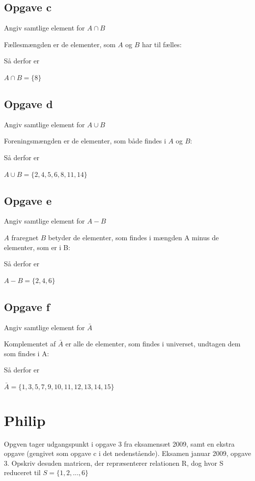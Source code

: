 \documentclass{article}
\begin{document}
\subsection*{Opgave c}
Angiv samtlige element for $A \cap B$

Fællesmængden er de elementer, som $A$ og $B$ har til fælles:

Så derfor er

\begin{center}
$A \cap B = \{ 8 \}$  
\end{center}

\subsection*{Opgave d}
Angiv samtlige element for $A \cup B$

Foreningsmængden er de elementer, som både findes i $A$ og $B$:

Så derfor er

\begin{center}
$A \cup B = \{ 2, 4, 5, 6, 8, 11, 14 \}$  
\end{center}

\subsection*{Opgave e}
Angiv samtlige element for $A - B$

$A$ fraregnet $B$ betyder de elementer, som findes i mængden A minus de elementer, som er i B:

Så derfor er

\begin{center}
$A - B = \{ 2, 4, 6 \}$  
\end{center}

\subsection*{Opgave f}
Angiv samtlige element for $\bar{A}$

Komplementet af $\bar{A}$ er alle de elementer, som findes i universet, undtagen dem som findes i A:

Så derfor er

\begin{center}
$\bar{A} = \{ 1, 3, 5, 7, 9, 10, 11, 12, 13, 14, 15 \}$  
\end{center}

\section{ Philip}
Opgven tager udgangspunkt i opgave 3 fra eksamensæt 2009, samt en ekstra opgave (gengivet som opgave c i det nedenstående).
Eksamen januar 2009, opgave 3. Opskriv desuden matricen, der repræsenterer relationen R, dog hvor S reduceret til $S = \{1,2,...,6\}$
\end{document}
